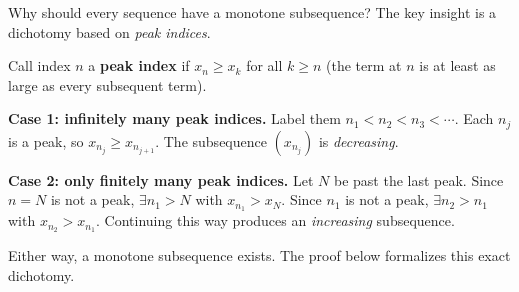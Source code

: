 \begin{remark*}
Why should every sequence have a monotone subsequence?
The key insight is a dichotomy based on \emph{peak indices}.

\medskip
Call index $n$ a \textbf{peak index} if $x_n \ge x_k$ for all $k \ge n$
(the term at $n$ is at least as large as every subsequent term).

\medskip
\textbf{Case 1: infinitely many peak indices.}
Label them $n_1 < n_2 < n_3 < \cdots$. Each $n_j$ is a peak, so
$x_{n_j} \ge x_{n_{j+1}}$. The subsequence $(x_{n_j})$ is \emph{decreasing}.

\medskip
\textbf{Case 2: only finitely many peak indices.}
Let $N$ be past the last peak. Since $n = N$ is not a peak, $\exists n_1 > N$
with $x_{n_1} > x_N$. Since $n_1$ is not a peak, $\exists n_2 > n_1$ with
$x_{n_2} > x_{n_1}$. Continuing this way produces an \emph{increasing}
subsequence.

\medskip
Either way, a monotone subsequence exists. The proof below formalizes
this exact dichotomy.

\begin{figure}[h]
\centering
{}
\end{figure}
\end{remark*}
